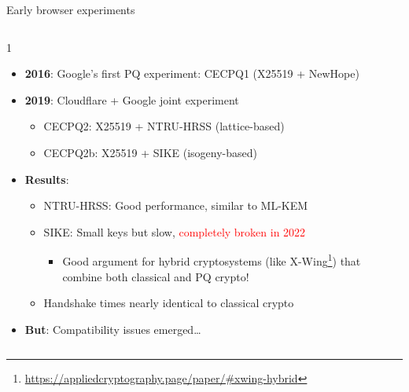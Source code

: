 \ifdefined\PRESENTATION\else\PassOptionsToClass{handout}{beamer}\fi\documentclass[aspectratio=169, lualatex]{beamer}
\begin{document}
\begin{frame}{Early browser experiments}
	\begin{columns}[c]
		\begin{column}{1\textwidth}
			\begin{itemize}
				\item \textbf{2016}: Google's first PQ experiment: CECPQ1 (X25519 + NewHope)
				\item \textbf{2019}: Cloudflare + Google joint experiment
				      \begin{itemize}
					      \item CECPQ2: X25519 + NTRU-HRSS (lattice-based)
					      \item CECPQ2b: X25519 + SIKE (isogeny-based)
				      \end{itemize}
				\item \textbf{Results}:
				      \begin{itemize}
					      \item NTRU-HRSS: Good performance, similar to ML-KEM
					      \item SIKE: Small keys but slow, \textcolor{red}{completely broken in 2022}
					            \begin{itemize}
						            \item Good argument for hybrid cryptosystems (like X-Wing\footnote{\url{https://appliedcryptography.page/paper/\#xwing-hybrid}}) that combine both classical and PQ crypto!
					            \end{itemize}
					      \item Handshake times nearly identical to classical crypto
				      \end{itemize}
				\item \textbf{But}: Compatibility issues emerged\ldots
			\end{itemize}
		\end{column}
	\end{columns}
\end{frame}
\end{document}
